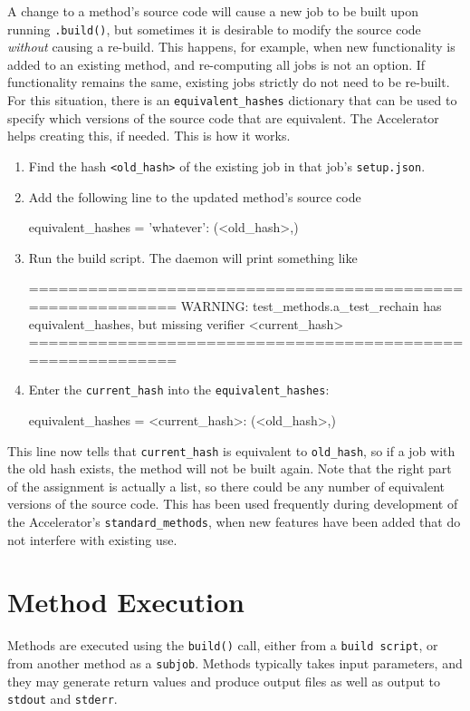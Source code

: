 A change to a method's source code will cause a new job to be built
upon running \texttt{.build()}, but sometimes it is
desirable to modify the source code \textsl{without} causing a
re-build.  This happens, for example, when new functionality is added
to an existing method, and re-computing all jobs is not an option.  If
functionality remains the same, existing jobs strictly do not need to
be re-built.  For this situation, there is an
\texttt{equivalent\_hashes} dictionary that can be used to specify
which versions of the source code that are equivalent.  The
Accelerator helps creating this, if needed.  This is how it works.
\begin{enumerate}
\item Find the hash \texttt{<old\_hash>} of the existing job in that
  job's \texttt{setup.json}.
\item Add the following line to the updated method's source code
\begin{python}
equivalent_hashes = {'whatever': (<old_hash>,)}
\end{python}
\item Run the build script.  The daemon will print something like
\begin{shell}
===========================================================
WARNING: test_methods.a_test_rechain has equivalent_hashes,
but missing verifier <current_hash>
===========================================================
\end{shell}
\item Enter the \texttt{current\_hash} into the
  \texttt{equivalent\_hashes}:
\begin{python}
equivalent_hashes = {<current_hash>: (<old_hash>,)}
\end{python}
\end{enumerate}
This line now tells that \texttt{current\_hash} is equivalent to
\texttt{old\_hash}, so if a job with the old hash exists, the method
will not be built again.  Note that the right part of the assignment
is actually a list, so there could be any number of equivalent
versions of the source code.  This has been used frequently during
development of the Accelerator's \texttt{standard\_methods}, when new
features have been added that do not interfere with existing use.



\section{Method Execution}
Methods are executed using the \texttt{build()} call, either from a
\texttt{build script}, or from another method as a \texttt{subjob}.
Methods typically takes input parameters, and they may generate return
values and produce output files as well as output to \texttt{stdout}
and \texttt{stderr}.

